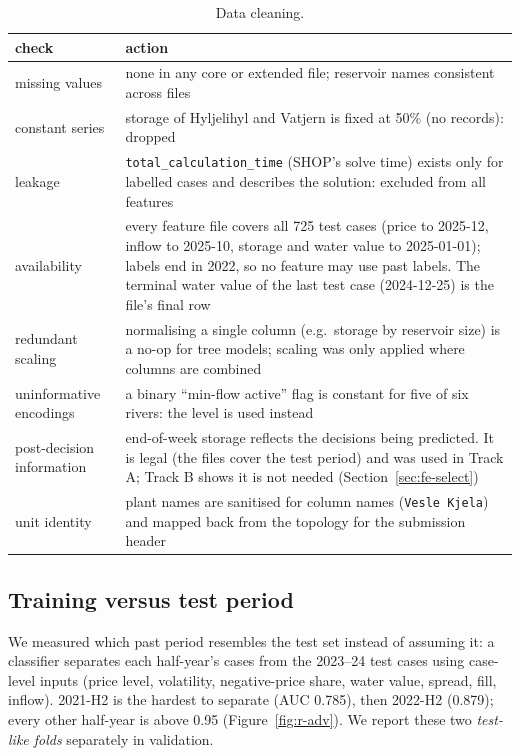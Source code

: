\documentclass[11pt]{article}
\begin{document}
\begin{table}[H]
\centering\small
\begin{tabularx}{\linewidth}{lY}
\toprule
check & action \\
\midrule
missing values & none in any core or extended file; reservoir names consistent across files \\
constant series & storage of Hyljelihyl and Vatjern is fixed at 50\% (no records): dropped \\
leakage & \texttt{total\_calculation\_time} (SHOP's solve time) exists only for labelled cases and
  describes the solution: excluded from all features \\
availability & every feature file covers all 725 test cases (price to 2025-12, inflow to 2025-10,
  storage and water value to 2025-01-01); labels end in 2022, so no feature may use past labels.
  The terminal water value of the last test case (2024-12-25) is the file's final row \\
redundant scaling & normalising a single column (e.g.\ storage by reservoir size) is a no-op for
  tree models; scaling was only applied where columns are combined \\
uninformative encodings & a binary ``min-flow active'' flag is constant for five of six rivers: the
  level is used instead \\
post-decision information & end-of-week storage reflects the decisions being predicted. It is legal
  (the files cover the test period) and was used in Track A; Track B shows it is not needed
  (Section~\ref{sec:fe-select}) \\
unit identity & plant names are sanitised for column names (\texttt{Vesle Kjela}) and mapped back
  from the topology for the submission header \\
\bottomrule
\end{tabularx}
\caption{Data cleaning.}
\label{tab:r-clean}
\end{table}

\subsection{Training versus test period}
\label{sec:eda-shift}

We measured which past period resembles the test set instead of assuming it: a classifier separates
each half-year's cases from the 2023--24 test cases using case-level inputs (price level,
volatility, negative-price share, water value, spread, fill, inflow). 2021-H2 is the hardest to
separate (AUC 0.785), then 2022-H2 (0.879); every other half-year is above 0.95
(Figure~\ref{fig:r-adv}). We report these two \emph{test-like folds} separately in validation.
\end{document}
